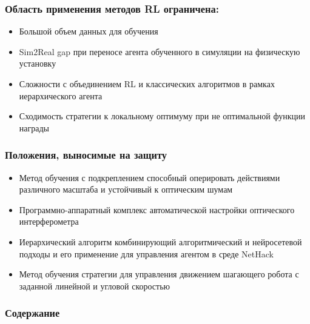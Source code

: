 \begin{frame}
    \setcounter{framenumber}{1}
    \maketitle
\end{frame}

\begin{frame}
    \frametitle{Область применения методов RL ограничена:}
    \begin{itemize}
        \item Большой объем данных для обучения
        \item Sim2Real gap при переносе агента обученного в симуляции на физическую установку
       \item Сложности с объединением RL и классических алгоритмов в рамках иерархического агента 
        \item Сходимость стратегии к локальному оптимуму при не оптимальной функции награды
    \end{itemize}
\end{frame}

\begin{frame}
    \frametitle{Положения, выносимые на защиту}
    \begin{itemize}
        \item Метод обучения с подкреплением способный
оперировать действиями различного масштаба и устойчивый к
оптическим шумам
        \item Программно-аппаратный комплекс автоматической настройки оптического интерферометра
        \item Иерархический алгоритм комбинирующий алгоритмический и нейросетевой подходы и его применение для управления агентом в среде NetHack
        \item Метод обучения стратегии для управления движением шагающего робота с заданной линейной и угловой скоростью
    \end{itemize}
\end{frame}

\begin{frame}
    \frametitle{Содержание}
    \tableofcontents
\end{frame}
